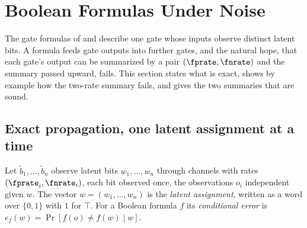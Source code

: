 %
%

\section{Boolean Formulas Under Noise}
\label{sec:boolean-formulas}

The gate formulas of  and  describe
one gate whose inputs observe distinct latent bits. A formula feeds gate outputs
into further gates, and the natural hope, that each gate's output can be
summarized by a pair $(\fprate, \fnrate)$ and the summary passed upward, fails.
This section states what is exact, shows by example how the two-rate summary
fails, and gives the two summaries that are sound.

\subsection*{Exact propagation, one latent assignment at a time}

\begin{definition}
\label{def:latent-assignment}
Let $\tilde{b}_1, \ldots, \tilde{b}_n$ observe latent bits $w_1, \ldots, w_n$
through channels with rates $(\fprate_i, \fnrate_i)$, each bit observed once,
the observations $o_i$ independent given $w$. The vector $w = (w_1, \ldots,
w_n)$ is the \emph{latent assignment}, written as a
word over $\{0, 1\}$ with $1$ for $\top$. For a Boolean formula $f$ its
\emph{conditional error} is $e_f(w) = \Pr[f(o) \neq f(w) \mid w]$.
\end{definition}


